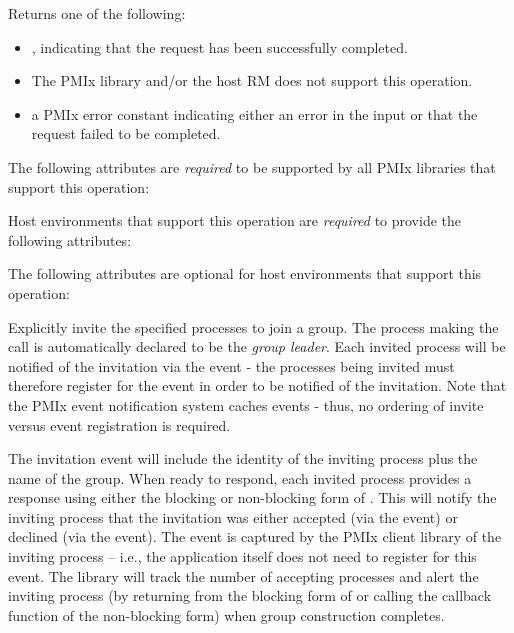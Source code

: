 Returns one of the following:

\begin{itemize}
    \item {}, indicating that the request has been successfully completed.
    \item {} The \ac{PMIx} library and/or the host \ac{RM} does not support this operation.
    \item a \ac{PMIx} error constant indicating either an error in the input or that the request failed to be completed.
\end{itemize}

\reqattrstart
The following attributes are \textit{required} to be supported by all \ac{PMIx} libraries that support this operation:


Host environments that support this operation are \textit{required} to provide the following attributes:

\reqattrend

\optattrstart
The following attributes are optional for host environments that support this operation:


\optattrend

\descr

Explicitly invite the specified processes to join a group. The process making the  call is automatically declared to be the \emph{group leader}. Each invited process will be notified of the invitation via the  event - the processes being invited must therefore register for the  event in order to be notified of the invitation. Note that the \ac{PMIx} event notification system caches events - thus, no ordering of invite versus event registration is required.

The invitation event will include the identity of the inviting process plus the name of the group. When ready to respond, each invited process provides a response using either the blocking or non-blocking form of . This will notify the inviting process that the invitation was either accepted (via the  event) or declined (via the  event). The  event is captured by the \ac{PMIx} client library of the inviting process – i.e., the application itself does not need to register for this event. The library will track the number of accepting processes and alert the inviting process (by returning from the blocking form of  or calling the callback function of the non-blocking form) when group construction completes.

